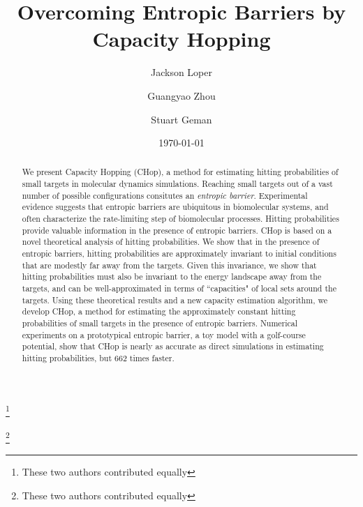 \documentclass[english, aip, jcp, priprint, graphicx,floatfix]{revtex4-1}
\theoremstyle{plain}
\theoremstyle{definition}
\theoremstyle{plain}
\begin{document}
\title{Overcoming Entropic Barriers by Capacity Hopping} %

\author{Jackson Loper}
\thanks{These two authors contributed equally}

\author{Guangyao Zhou}
\thanks{These two authors contributed equally}

\author{Stuart Geman}

\date{\today}

\begin{abstract}
	We present Capacity Hopping (CHop), a method for estimating hitting probabilities of small targets in molecular dynamics simulations. Reaching small targets out of a vast number of possible configurations consitutes an \emph{entropic barrier}. Experimental evidence suggests that entropic barriers are ubiquitous in biomolecular systems, and often characterize the rate-limiting step of biomolecular processes. Hitting probabilities provide valuable information in the presence of entropic barriers. CHop is based on a novel theoretical analysis of hitting probabilities. We show that in the presence of entropic barriers, hitting probabilities are approximately invariant to initial conditions that are modestly far away from the targets.  Given this invariance, we show that hitting probabilities must also be invariant to the energy landscape away from the targets, and can be well-approximated in terms of ``capacities" of local sets around the targets.  Using these theoretical results and a new capacity estimation algorithm, we develop CHop, a method for estimating the approximately constant hitting probabilities of small targets in the presence of entropic barriers. Numerical experiments on a prototypical entropic barrier, a toy model with a golf-course potential, show that CHop is nearly as accurate as direct simulations in estimating hitting probabilities, but 662 times faster.
\end{abstract}

\pacs{}%

\maketitle %
\end{document}
